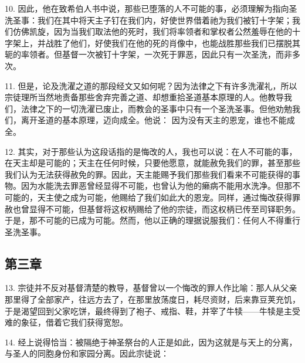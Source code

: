 10. 因此，他在致希伯人书中说，那些已堕落的人不可能的事，必须理解为指向圣洗圣事：我们在其中将天主子钉在我们内，好使世界借着祂为我们被钉十字架；我们仿佛凯旋，因为当我们取法他的死时，我们将率领者和掌权者公然羞辱在他的十字架上，并战胜了他们，好使我们在他的死的肖像中，也能战胜那些我们已摆脱其轭的率领者。但基督一次被钉十字架，一次死于罪恶，因此只有一次圣洗，而非多次。\par

11. 但是，论及洗濯之道的那段经文又如何呢？因为法律之下有许多洗濯礼，所以宗徒理所当然地责备那些舍弃完善之道、却想重拾圣道基本原理的人。他教导我们，法律之下的一切洗濯已废止，而教会的圣事中只有一个圣洗圣事。但他劝勉我们，离开圣道的基本原理，迈向成全。他说：  因为没有天主的恩宠，谁也不能成全。\par

12. 其实，对于那些认为这段话指的是悔改的人，我也可以说：在人不可能的事，在天主却是可能的；天主在任何时候，只要他愿意，就能赦免我们的罪，甚至那些我们认为无法获得赦免的罪。因此，天主能赐予我们那些我们看来不可能获得的事物。因为水能洗去罪恶曾经显得不可能，也曾认为他的癞病不能用水洗净。但那不可能的，天主使之成为可能，他赐给了我们如此大的恩宠。同样，通过悔改获得罪赦也曾显得不可能，但基督将这权柄赐给了他的宗徒，而这权柄已传至司铎职务。于是，那不可能的已成为可能。然而，他以正确的理据说服我们：任何人不得重行圣洗圣事。\par


\subsection{第三章}

\par

13. 宗徒并不反对基督清楚的教导，基督曾以一个悔改的罪人作比喻：那人从父亲那里得了全部家产，往远方去了，在那里放荡度日，耗尽资财，后来靠豆荚充饥，于是渴望回到父家吃饼，最终得到了袍子、戒指、鞋，并宰了牛犊——牛犊是主受难的象征，借着它我们获得宽恕。\par

14. 经上说得恰当：被隔绝于神圣祭台的人正是如此，因为这就是与天上的分离，与圣人的同胞身份和家园分离。因此宗徒说： \par

